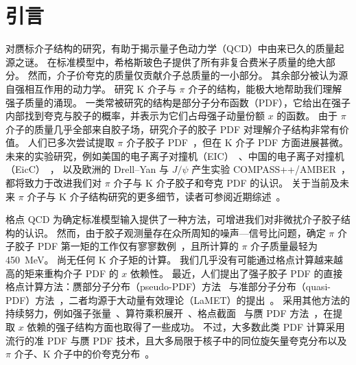\section{引言}\label{sec:intro}

对赝标介子结构的研究，有助于揭示量子色动力学（QCD）中由来已久的质量起源之谜。
在标准模型中，希格斯玻色子提供了所有非复合费米子质量的绝大部分。
然而，介子价夸克的质量仅贡献介子总质量的一小部分。
其余部分被认为源自强相互作用的动力学。
研究 K 介子与 $\pi$ 介子的结构，能极大地帮助我们理解强子质量的涌现。
一类常被研究的结构是部分子分布函数（PDF），它给出在强子内部找到夸克与胶子的概率，并表示为它们占母强子动量份额 $x$ 的函数。
由于 $\pi$ 介子的质量几乎全部来自胶子场，研究介子的胶子 PDF 对理解介子结构非常有价值。
人们已多次尝试提取 $\pi$ 介子胶子 PDF~\cite{Barry:2018ort,Cao:2021aci,Novikov:2020snp,Chang:2020rdy}，但在 K 介子 PDF 方面进展甚微。
未来的实验研究，例如美国的电子离子对撞机（EIC）~\cite{Accardi:2012qut,AbdulKhalek:2021gbh}、中国的电子离子对撞机（EicC）~\cite{Anderle:2021wcy}，
以及欧洲的 Drell--Yan 与 $J/\psi$ 产生实验 COMPASS++/AMBER~\cite{Denisov:2018unj}，都将致力于改进我们对 $\pi$ 介子与 K 介子胶子和夸克 PDF 的认识。
关于当前及未来 $\pi$ 介子与 K 介子结构研究的更多细节，读者可参阅近期综述~\cite{Aguilar:2019teb,Roberts:2021nhw,Arrington:2021biu}。


格点 QCD 为确定标准模型输入提供了一种方法，可增进我们对非微扰介子胶子结构的认识。
然而，由于胶子观测量存在众所周知的噪声—信号比问题，确定 $\pi$ 介子胶子 PDF 第一矩的工作仅有寥寥数例~\cite{Meyer:2007tm,Shanahan:2018pib}，且所计算的 $\pi$ 介子质量最轻为 450~MeV。
尚无任何 K 介子矩的计算。
我们几乎没有可能通过格点计算越来越高的矩来重构介子 PDF 的 $x$ 依赖性。
最近，人们提出了强子胶子 PDF 的直接格点计算方法：赝部分子分布（pseudo-PDF）方法~\cite{Balitsky:2019krf} 与准部分子分布（quasi-PDF）方法~\cite{Zhang:2018diq,Wang:2019tgg}，二者均源于大动量有效理论（LaMET）的提出~\cite{Ji:2013dva,Ji:2014gla,Ji:2017rah}。
采用其他方法的持续努力，例如强子张量~\cite{Liu:1993cv}、算符乘积展开~\cite{Detmold:2005gg}、格点截面~\cite{Ma:2014jla,Ma:2017pxb} 与赝 PDF 方法~\cite{Radyushkin:2017cyf,Orginos:2017kos}，在提取 $x$ 依赖的强子结构方面也取得了一些成功。
不过，大多数此类 PDF 计算采用流行的准 PDF 与赝 PDF 技术，且大多局限于核子中的同位旋矢量夸克分布以及 $\pi$ 介子、K 介子中的价夸克分布~\cite{Lin:2013yra,Lin:2014zya,Chen:2016utp,Lin:2017ani,Alexandrou:2015rja,Alexandrou:2016jqi,Alexandrou:2017huk,Chen:2017mzz,Alexandrou:2018pbm,Chen:2018xof,Chen:2018fwa,Alexandrou:2018eet,Lin:2018qky,Fan:2018dxu,Liu:2018hxv,Wang:2019tgg,Lin:2019ocg,Chen:2019lcm,Lin:2020reh,Chai:2020nxw,Bhattacharya:2020cen,Lin:2020ssv,Zhang:2020dkn,Li:2020xml,Fan:2020nzz,Gao:2020ito,Lin:2020fsj,Lin:2021brq,Zhang:2020rsx,Alexandrou:2020qtt,Alexandrou:2020zbe,Lin:2020rxa,Gao:2021hxl,Lin:2020rut,Orginos:2017kos,Karpie:2017bzm,Karpie:2018zaz,Karpie:2019eiq,Joo:2019jct,Joo:2019bzr,Radyushkin:2018cvn,Zhang:2018ggy,Izubuchi:2018srq,Joo:2020spy,Bhat:2020ktg,Fan:2020cpa,Sufian:2020wcv,Karthik:2021qwz,Chen:2018fwa,Sufian:2019bol,Izubuchi:2019lyk,Joo:2019bzr,Sufian:2020vzb,Shugert:2020tgq,Gao:2020ito}。


